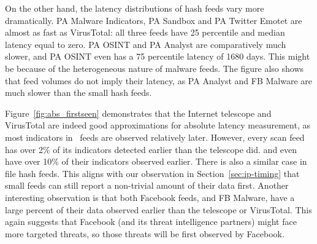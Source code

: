 On the other hand, the latency distributions of hash feeds vary more dramatically.
PA Malware Indicators, PA Sandbox and PA Twitter Emotet are almost as fast as
VirusTotal: all three feeds have 25 percentile and median latency equal to zero.
PA OSINT and PA Analyst are comparatively much slower, and PA OSINT even has a 75
percentile latency of 1680 days. This might be because of the heterogeneous nature of
malware feeds. The figure also shows that feed volumes do not imply
their latency, as PA Analyst and FB Malware are much slower than the small hash
feeds.

Figure~\ref{fig:abs_firstseen} demonstrates that the Internet telescope and VirusTotal
are indeed good approximations for absolute latency measurement, as most
indicators in \ti\ feeds are observed relatively later. However, every scan
feed has over 2\% of its indicators detected earlier than the telescope did.
{\feedFBBasecamp} and {\feeddshield} even have over 10\% of their indicators observed
earlier. There is also a similar case in file hash feeds. This aligns with
our observation in Section~\ref{sec:ip-timing} that small feeds can still report
a non-trivial amount of their data first. Another interesting observation is that
both Facebook feeds, {\feedFBBasecamp} and FB Malware, have a large percent of
their data observed earlier than the telescope or VirusTotal. This again suggests
that Facebook (and its threat intelligence partners) might face more targeted
threats, so those threats will be first observed by Facebook.
